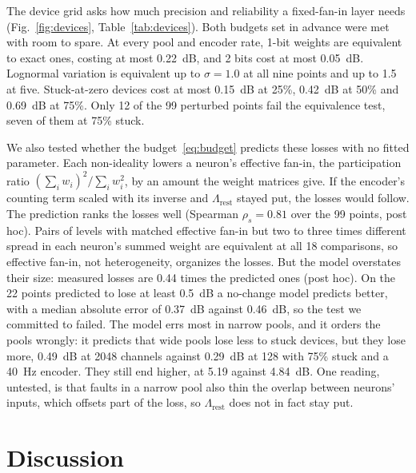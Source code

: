 \documentclass[conference]{IEEEtran}
\newcommand{\dB}{~dB}
\begin{document}


The device grid asks how much precision and reliability a fixed-fan-in layer
needs (Fig.~\ref{fig:devices}, Table~\ref{tab:devices}). Both budgets set in
advance were met with room to spare. At every pool and encoder rate, 1-bit
weights are equivalent to exact ones, costing at most 0.22\dB, and 2 bits
cost at most 0.05\dB. Lognormal variation is equivalent up to $\sigma = 1.0$ at
all nine points and up to 1.5 at five. Stuck-at-zero devices cost at most
0.15\dB{} at 25\%, 0.42\dB{} at 50\% and 0.69\dB{} at 75\%. Only 12 of the 99
perturbed points fail the equivalence test, seven of them at 75\% stuck.

We also tested whether the budget~\eqref{eq:budget} predicts these losses with
no fitted parameter. Each non-ideality lowers a neuron's effective fan-in, the
participation ratio $(\sum_i w_i)^2/\sum_i w_i^2$, by an amount the weight
matrices give. If the encoder's counting term scaled with its inverse and
$\Lambda_\mathrm{rest}$ stayed put, the losses would follow. The prediction
ranks the losses well (Spearman $\rho_s = 0.81$ over the 99 points, post hoc).
Pairs of levels with matched effective fan-in but two to three times
different spread in each neuron's summed weight are equivalent at all 18
comparisons, so effective fan-in, not heterogeneity, organizes the losses. But
the model overstates their size: measured losses are 0.44 times the predicted
ones (post hoc). On the 22 points predicted to lose at least 0.5\dB{} a
no-change model predicts better, with a median absolute error of 0.37\dB{}
against 0.46\dB, so the test we committed to failed. The model errs most in
narrow pools, and it orders the pools wrongly: it predicts that wide pools lose
less to stuck devices, but they lose more, 0.49\dB{} at 2048 channels against
0.29\dB{} at 128 with 75\% stuck and a 40~Hz encoder. They still end higher,
at 5.19 against 4.84\dB. One reading, untested, is that faults in a narrow pool also thin the
overlap between neurons' inputs, which offsets part of the loss, so
$\Lambda_\mathrm{rest}$ does not in fact stay put.

\section{Discussion}
\label{sec:discussion}
\end{document}
